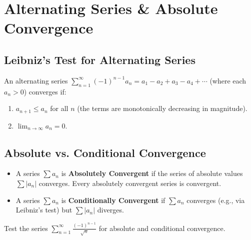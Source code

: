 \section{Alternating Series \& Absolute Convergence}

\subsection{Leibniz's Test for Alternating Series}

\begin{theorem}
An alternating series $\sum_{n=1}^\infty (-1)^{n-1} a_n = a_1 - a_2 + a_3 - a_4 + \cdots$ (where each $a_n > 0$) converges if:
\begin{enumerate}[leftmargin=1.5em]
    \item $a_{n+1} \le a_n$ for all $n$ (the terms are monotonically decreasing in magnitude).
    \item $\lim_{n\to\infty} a_n = 0$.
\end{enumerate}
\end{theorem}

\subsection{Absolute vs. Conditional Convergence}

\begin{definition}
\begin{itemize}[leftmargin=1.5em]
    \item A series $\sum a_n$ is \textbf{Absolutely Convergent} if the series of absolute values $\sum |a_n|$ converges. Every absolutely convergent series is convergent.
    \item A series $\sum a_n$ is \textbf{Conditionally Convergent} if $\sum a_n$ converges (e.g., via Leibniz's test) but $\sum |a_n|$ diverges.
\end{itemize}
\end{definition}

\begin{example}
Test the series $\sum_{n=1}^\infty \frac{(-1)^{n-1}}{\sqrt{n}}$ for absolute and conditional convergence.
\end{example}

